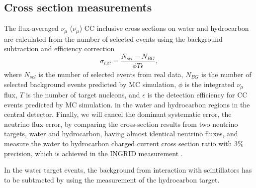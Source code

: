 

\subsection{Cross section measurements}
The flux-averaged $\nu_{\mu}$ ($\overline{\nu_{\mu}}$) CC inclusive cross sections on water and hydrocarbon are calculated from the number of selected events
using the background subtraction and efficiency correction
\begin{equation}
\sigma_{CC} = \frac{N_{sel}-N_{BG}}{\phi T \epsilon},
\end{equation}
where $N_{sel}$ is the number of selected events from real data,
$N_{BG}$ is the number of selected background events predicted by MC simulation,
$\phi$ is the integrated $\nu_{\mu}$ flux, $T$ is the number of target nucleons,
and $\epsilon$ is the detection efficiency for CC events predicted by MC simulation.
in the water and hydrocarbon regions in the central detector.
Finally, we will cancel the dominant systematic error, the neutrino flux error, by comparing the cross-section results from two neutrino targets, water and hydrocarbon, having almost identical neutrino fluxes, and measure the water to hydrocarbon charged current cross section ratio with 3\% precision, which is achieved in the INGRID measurement \cite{ingrid_ccinclusive}.



In the water target events, the background from interaction with scintillators has to be subtracted by using the measurement of the hydrocarbon target.

